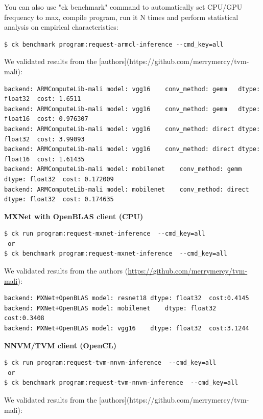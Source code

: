 \documentclass[sigplan]{acmart}
\begin{document}
You can also use "ck benchmark" command to automatically set CPU/GPU frequency to max, 
compile program, run it N times and perform statistical analysis on empirical characteristics:

\begin{verbatim}
$ ck benchmark program:request-armcl-inference --cmd_key=all
\end{verbatim}

We validated results from the [authors](https://github.com/merrymercy/tvm-mali):

\begin{verbatim}
backend: ARMComputeLib-mali	model: vgg16	conv_method: gemm	dtype: float32	cost: 1.6511
backend: ARMComputeLib-mali	model: vgg16	conv_method: gemm	dtype: float16	cost: 0.976307
backend: ARMComputeLib-mali	model: vgg16	conv_method: direct	dtype: float32	cost: 3.99093
backend: ARMComputeLib-mali	model: vgg16	conv_method: direct	dtype: float16	cost: 1.61435
backend: ARMComputeLib-mali	model: mobilenet	conv_method: gemm	dtype: float32	cost: 0.172009
backend: ARMComputeLib-mali	model: mobilenet	conv_method: direct	dtype: float32	cost: 0.174635
\end{verbatim}

\textbf{MXNet with OpenBLAS client (CPU)}

\begin{verbatim} 
$ ck run program:request-mxnet-inference  --cmd_key=all
 or
$ ck benchmark program:request-mxnet-inference  --cmd_key=all

\end{verbatim}

We validated results from the authors (\url{https://github.com/merrymercy/tvm-mali}):

\begin{verbatim}
backend: MXNet+OpenBLAS	model: resnet18	dtype: float32	cost:0.4145
backend: MXNet+OpenBLAS	model: mobilenet	dtype: float32	cost:0.3408
backend: MXNet+OpenBLAS	model: vgg16	dtype: float32	cost:3.1244
\end{verbatim}

\textbf{NNVM/TVM client (OpenCL)}

\begin{verbatim}
$ ck run program:request-tvm-nnvm-inference  --cmd_key=all 
 or
$ ck benchmark program:request-tvm-nnvm-inference  --cmd_key=all 

\end{verbatim}

We validated results from the [authors](https://github.com/merrymercy/tvm-mali):
\end{document}
